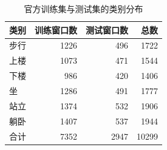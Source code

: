 \begin{table}[htbp]\centering\small
\caption{官方训练集与测试集的类别分布}\label{tab:data}
\begin{tabular}{lrrr}\toprule
类别 & 训练窗口数 & 测试窗口数 & 总数\\\midrule
步行 & 1226 & 496 & 1722\\
上楼 & 1073 & 471 & 1544\\
下楼 & 986 & 420 & 1406\\
坐 & 1286 & 491 & 1777\\
站立 & 1374 & 532 & 1906\\
躺卧 & 1407 & 537 & 1944\\
合计 & 7352 & 2947 & 10299\\
\bottomrule\end{tabular}
\end{table}

